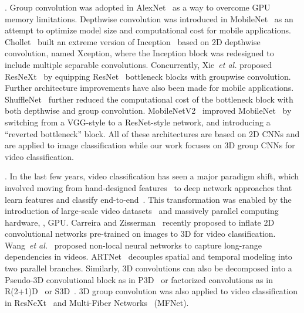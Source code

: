 \documentclass[10pt,twocolumn,letterpaper]{article}
\begin{document}
. Group convolution was adopted in AlexNet~\cite{Krizhevsky12} as a way to overcome GPU memory limitations. Depthwise convolution was introduced in MobileNet~\cite{MobileNet} as an attempt to optimize model size and computational cost for mobile applications. Chollet~\cite{Xception} built an extreme version of Inception~\cite{Inception} based on 2D depthwise convolution, named Xception, where the Inception block was redesigned to include multiple separable convolutions. Concurrently, Xie~\emph{et al.} proposed ResNeXt~\cite{SainingXie17} by equipping ResNet~\cite{KaimingHe16} bottleneck blocks with groupwise convolution.  Further architecture improvements have also been made for mobile applications. ShuffleNet~\cite{ShuffleNet} further reduced the computational cost of the bottleneck block with both depthwise and group convolution. MobileNetV2~\cite{MobileNet2} improved MobileNet~\cite{MobileNet} by switching from a VGG-style to a ResNet-style network, and introducing a ``reverted bottleneck'' block. All of these architectures are based on 2D CNNs and are applied to image classification while our work focuses on 3D group CNNs for video classification.

. In the last few years, video classification has seen a major paradigm shift, which involved moving from hand-designed features~\cite{Laptev03,Piotr05,ActionBank,Wang2013} to deep network approaches that learn features and classify end-to-end~\cite{Tran15,Karpathy14,SimonyanZ14,FeichtenhoferNIPS16,WangXW0LTG16,Wang_Transformation,FeichtenhoferPZ16}. This transformation was enabled by the introduction of large-scale video datasets~\cite{Karpathy14,kinetics} and massively parallel computing hardware, \ie, GPU. Carreira and Zisserman~\cite{I3D} recently proposed to inflate 2D convolutional networks pre-trained on images to 3D for video classification. Wang~\emph{et al.}~\cite{XiaolongWang18} proposed non-local neural networks to capture long-range dependencies in videos. ARTNet~\cite{LiminWang18} decouples spatial and temporal modeling into two parallel branches. Similarly, 3D convolutions can also be decomposed into a Pseudo-3D convolutional block as in P3D~\cite{P3D} or factorized convolutions as in R(2+1)D~\cite{Tran18} or S3D~\cite{xie2017rethinking}. 3D group convolution was also applied to video classification in ResNeXt~\cite{retrace} and Multi-Fiber Networks~\cite{MFNet} (MFNet). 
\end{document}
